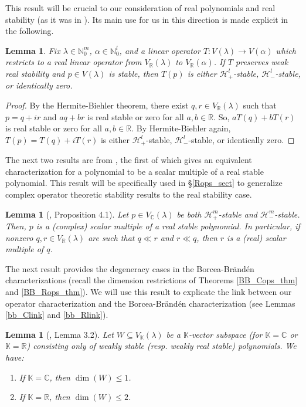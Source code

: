 \documentclass{article}
\newtheorem{lemma}[theorem]{Lemma}
\theoremstyle{definition}
\theoremstyle{plain}
\newcommand{\C}{\mathbb{C}}
\newcommand{\R}{\mathbb{R}}
\newcommand{\N}{\mathbb{N}}
\newcommand{\K}{\mathbb{K}}
\newcommand{\UHP}{\mathcal{H}_+}
\newcommand{\LHP}{\mathcal{H}_-}
\begin{document}
This result will be crucial to our consideration of real polynomials and real stability (as it was in \cite{bb1}). Its main use for us in this direction is made explicit in the following.

\begin{lemma}\label{rs_lemma}
    Fix $\lambda \in \N_0^m$, $\alpha \in \N_0^l$, and a linear operator $T: V(\lambda) \to V(\alpha)$ which restricts to a real linear operator from $V_\R(\lambda)$ to $V_\R(\alpha)$. If $T$ preserves weak real stability and $p \in V(\lambda)$ is stable, then $T(p)$ is either $\UHP^l$-stable, $\LHP^l$-stable, or identically zero.
\end{lemma}
\begin{proof}
    By the Hermite-Biehler theorem, there exist $q,r \in V_\R(\lambda)$ such that $p = q + ir$ and $a q + b r$ is real stable or zero for all $a,b \in \R$. So, $a T(q) + b T(r)$ is real stable or zero for all $a,b \in \R$. By Hermite-Biehler again, $T(p) = T(q) + iT(r)$ is either $\UHP^l$-stable, $\LHP^l$-stable, or identically zero.
\end{proof}

The next two results are from \cite{bb1}, the first of which gives an equivalent characterization for a polynomial to be a scalar multiple of a real stable polynomial. This result will be specifically used in \S\ref{Rops_sect} to generalize complex operator theoretic stability results to the real stability case.

\begin{lemma}[\cite{bb1}, Proposition 4.1]\label{scal_rs_lemma}
    Let $p \in V_\C(\lambda)$ be both $\UHP^m$-stable and $\LHP^m$-stable. Then, $p$ is a (complex) scalar multiple of a real stable polynomial. In particular, if nonzero $q,r \in V_\R(\lambda)$ are such that $q \ll r$ and $r \ll q$, then $r$ is a (real) scalar multiple of $q$.
\end{lemma}

The next result provides the degeneracy cases in the Borcea-Br{\"a}nd{\'e}n characterizations (recall the dimension restrictions of Theorems \ref{BB_Cops_thm} and \ref{BB_Rops_thm}). We will use this result to explicate the link between our operator characterization and the Borcea-Br{\"a}nd{\'e}n characterization (see Lemmas \ref{bb_Clink} and \ref{bb_Rlink}).

\begin{lemma}[\cite{bb1}, Lemma 3.2]\label{dim_lemma}
    Let $W \subseteq V_\K(\lambda)$ be a $\K$-vector subspace (for $\K = \C$ or $\K = \R$) consisting only of weakly stable (resp. weakly real stable) polynomials. We have:
    \begin{enumerate}[label=(\alph*)]
        \item If $\K = \C$, then $\dim(W) \leq 1$.
        \item If $\K = \R$, then $\dim(W) \leq 2$.
    \end{enumerate}
\end{lemma}
\end{document}
